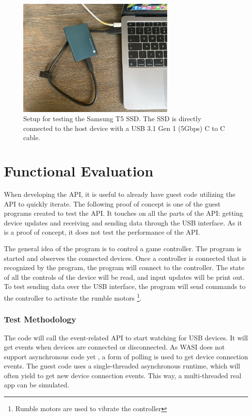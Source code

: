 \begin{figure}[H]
  \centering
  \includegraphics[width=0.7\textwidth]{images/t5_setup.png}
  \caption{Setup for testing the Samsung T5 SSD. The SSD is directly connected to the host device with a USB 3.1 Gen 1 (5Gbps) C to C cable.}
  \label{fig:samsung_setup}
\end{figure}




\section{Functional Evaluation}
\label{section:functional_evaluation}
When developing the API, it is useful to already have guest code utilizing the API to quickly iterate. The following proof of concept is one of the guest programs created to test the API. It touches on all the parts of the API: getting device updates and receiving and sending data through the USB interface. As it is a proof of concept, it does not test the performance of the API.

The general idea of the program is to control a game controller. The program is started and observes the connected devices. Once a controller is connected that is recognized by the program, the program will connect to the controller. The state of all the controls of the device will be read, and input updates will be print out. To test sending data over the USB interface, the program will send commands to the controller to activate the rumble motors \footnote{Rumble motors are used to vibrate the controller}.

\subsubsection{Test Methodology}
The code will call the event-related API to start watching for USB devices. It will get events when devices are connected or disconnected. As WASI does not support asynchronous code yet \cite{wasi_roadmap}, a form of polling is used to get device connection events. The guest code uses a single-threaded asynchronous runtime, which will often yield to get new device connection events. This way, a multi-threaded real app can be simulated.

